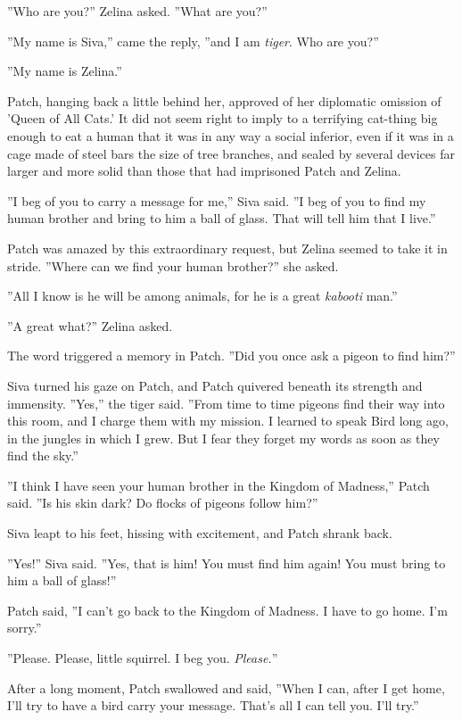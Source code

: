 \documentclass[11pt]{article}
\begin{document}
 ''Who are you?'' Zelina asked. ''What are you?''\par
 ''My name is Siva,'' came the reply, ''and I am {\it tiger}. Who are you?''\par
 ''My name is Zelina.''\par
Patch, hanging back a little behind her, approved of her diplomatic omission of 'Queen of All Cats.' It did not seem right to imply to a terrifying cat-thing big enough to eat a human that it was in any way a social inferior, even if it was in a cage made of steel bars the size of tree branches, and sealed by several devices far larger and more solid than those that had imprisoned Patch and Zelina.\par
''I beg of you to carry a message for me,'' Siva said. ''I beg of you to find my human brother and bring to him a ball of glass. That will tell him that I live.''\par
Patch was amazed by this extraordinary request, but Zelina seemed to take it in stride. ''Where can we find your human brother?'' she asked.\par
''All I know is he will be among animals, for he is a great {\it kabooti} man.''\par
''A great what?'' Zelina asked.\par
The word triggered a memory in Patch. ''Did you once ask a pigeon to find him?''\par
Siva turned his gaze on Patch, and Patch quivered beneath its strength and immensity. ''Yes,'' the tiger said. ''From time to time pigeons find their way into this room, and I charge them with my mission. I learned to speak Bird long ago, in the jungles in which I grew. But I fear they forget my words as soon as they find the sky.''\par
''I think I have seen your human brother in the Kingdom of Madness,'' Patch said. ''Is his skin dark? Do flocks of pigeons follow him?''\par
Siva leapt to his feet, hissing with excitement, and Patch shrank back.\par
''Yes!'' Siva said. ''Yes, that is him! You must find him again! You must bring to him a ball of glass!''\par
Patch said, ''I can't go back to the Kingdom of Madness. I have to go home. I'm sorry.''\par
''Please. Please, little squirrel. I beg you. {\it Please.}''\par
After a long moment, Patch swallowed and said, ''When I can, after I get home, I'll try to have a bird carry your message. That's all I can tell you. I'll try.''\par
\end{document}
